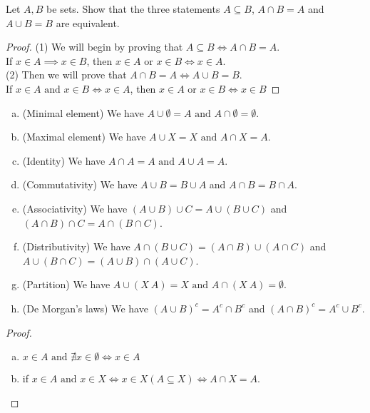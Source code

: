 \begin{exercise}
  Let $A, B$ be sets. Show that the three statements $A \subseteq B$, $A \cap B = A$ and $A \cup B = B$ are equivalent.
\end{exercise}
\begin{proof}
  (1) We will begin by proving that $A \subseteq B \iff A \cap B = A$. \\
  If $x \in A \implies x \in B$, then $x \in A \text{\ or\ } x \in B \iff x \in A$. \\
  (2) Then we will prove that $A \cap B = A \iff A \cup B = B$. \\
  If $x \in A \text{\ and\ } x \in B \iff x \in A$, then $x \in A \text{\ or\ } x \in B \iff x \in B$
\end{proof} 

\begin{exercise}
  \begin{enumerate}[(a)]
    \item (Minimal element) We have $A \cup \emptyset = A \text{\ and\ } A \cap \emptyset = \emptyset$.
    \item (Maximal element) We have $A \cup X = X \text{\ and\ } A \cap X = A$.
    \item (Identity) We have $A \cap A = A \text{\ and\ } A \cup A = A$.
    \item (Commutativity) We have $A \cup B = B \cup A$ and $A \cap B = B \cap A$.
    \item (Associativity) We have $(A \cup B) \cup C = A \cup (B \cup C)$ and $(A \cap B) \cap C = A \cap (B \cap C)$. 
    \item (Distributivity) We have $A \cap (B \cup C) = (A \cap B) \cup (A \cap C)$ and $A \cup (B \cap C) = (A \cup B) \cap (A \cup C)$. 
    \item (Partition) We have $A \cup (X \ A) = X \text{\ and\ } A \cap (X \ A) = \emptyset$. 
    \item (De Morgan's laws) We have $(A \cup B)^c = A^c \cap B^c$ and $(A \cap B)^c = A^c \cup B^c$.
  \end{enumerate}
\end{exercise}
\begin{proof}
\begin{enumerate}[(a)]
  \item $x \in A \text{\ and\ } \nexists x \in \emptyset \iff x \in A$
  \item if $x \in A \text{\ and\ } x \in X \iff x \in X (A \subseteq X) \iff A \cap X = A$.
\end{enumerate}
\end{proof}
